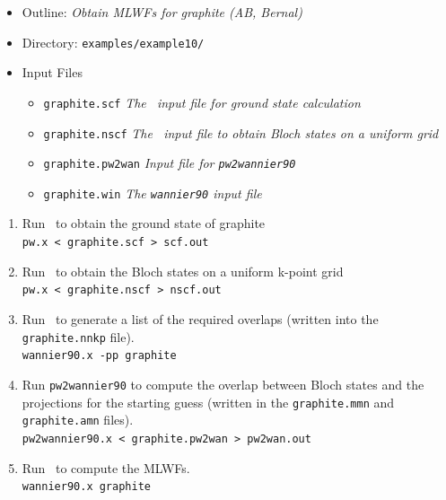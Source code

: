 \documentclass[a4paper,11pt,twoside]{article}
\begin{document}

\begin{itemize}
\item{Outline: \it{Obtain MLWFs for graphite (AB, Bernal)}}
\item{Directory: {\tt examples/example10/}}
\item{Input Files}
\begin{itemize}
\item{ {\tt graphite.scf}  {\it The \pwscf\ input file for ground
    state calculation}} 
\item{ {\tt graphite.nscf}  {\it The \pwscf\ input file to obtain Bloch
    states on a uniform grid}} 
\item{ {\tt graphite.pw2wan}  {\it Input file for {\tt pw2wannier90}}}
\item{ {\tt graphite.win}  {\it The {\tt wannier90} input file}}
\end{itemize}
\end{itemize}

\begin{enumerate}
\item Run \pwscf\ to obtain the ground state of graphite\\
{\tt pw.x < graphite.scf > scf.out}

\item Run \pwscf\ to obtain the Bloch states on a uniform k-point grid\\
{\tt pw.x < graphite.nscf > nscf.out}

\item Run \wannier\ to generate a list of the required overlaps (written
  into the {\tt graphite.nnkp} file).\\ 
{\tt wannier90.x -pp graphite}

\item Run {\tt pw2wannier90} to compute the overlap between Bloch
  states and the projections for the starting guess (written in the
  {\tt graphite.mmn} and {\tt graphite.amn} files).\\  
{\tt pw2wannier90.x < graphite.pw2wan > pw2wan.out}

\item Run \wannier\ to compute the MLWFs.\\
{\tt wannier90.x graphite}
\end{enumerate}




\end{document}
